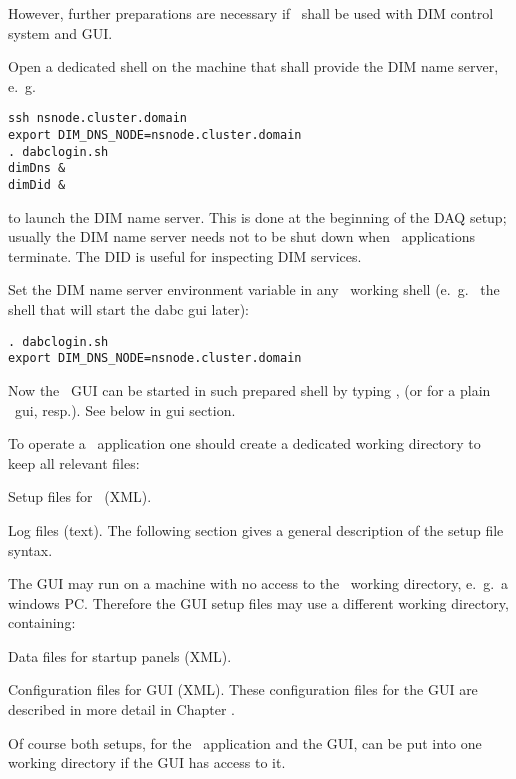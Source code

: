 However, further preparations are necessary if \dabc\ shall be used with
DIM control system and GUI.

\item Open a dedicated shell on the machine that shall provide the DIM name server,
e.~g.~ 
\begin{small}
\begin{verbatim}
ssh nsnode.cluster.domain
export DIM_DNS_NODE=nsnode.cluster.domain
. dabclogin.sh
dimDns &
dimDid &
\end{verbatim} 
\end{small}
to launch the DIM name server. This is done  at the beginning of
the DAQ setup; usually the DIM name server needs not to be shut down 
when \dabc\ applications terminate. The DID is useful for inspecting DIM services.

\item Set the DIM name server environment variable in any \dabc\ working shell (e.~g.~
the shell that will start the dabc gui later):
\begin{small}
\begin{verbatim}
. dabclogin.sh
export DIM_DNS_NODE=nsnode.cluster.domain
\end{verbatim} 
\end{small}

\item Now the \dabc\ GUI can be started in such prepared shell by typing , (or 
 for a plain \mbs\ gui, resp.). See below in gui section.  

\enum

\medskip
To operate a \dabc\ application one should create a dedicated 
working directory to keep all relevant files:
\bbul
\item Setup files for \dabc\ (XML).
\item Log files (text).
\ebul
The following section  
gives a general description of the setup file syntax.

The GUI may run on a machine with no access to the \dabc\ working directory,
e.~g.\ a windows PC.
Therefore the GUI setup files may use a different
working directory, containing: 
\bbul
\item Data files for startup panels (XML).
\item Configuration files for GUI (XML).
\ebul
These configuration files for the GUI are described in more detail 
in Chapter .

Of course both setups, for the \dabc\ application and the GUI, can be
put into one working directory if the GUI has access to it.



